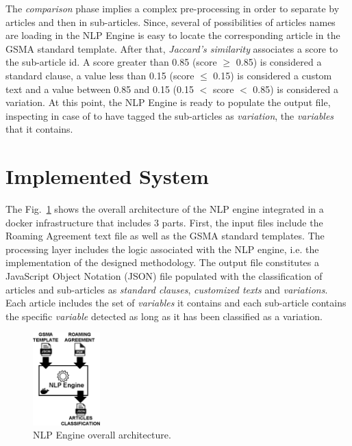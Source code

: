 \documentclass[conference]{style/IEEEtran}
\begin{document}
The \textit{comparison} phase implies a complex pre-processing in order to separate by articles and then in sub-articles. Since, several of possibilities of articles names are loading in the NLP Engine is easy to locate the corresponding article in the GSMA standard template. After that, \textit{Jaccard's similarity} associates a score to the sub-article id. A score greater than 0.85 (score $\geq$ 0.85) is considered a standard clause, a value less than 0.15 (score $\leq$ 0.15) is considered a custom text and a value between 0.85 and 0.15 (0.15 $<$ score $<$ 0.85) is considered a variation. At this point, the NLP Engine is ready to populate the output file, inspecting in case of to have tagged the sub-articles as \textit{variation}, the \textit{variables} that it contains.

\section{Implemented System}
The Fig.~\ref{fig2} shows the overall architecture of the NLP engine integrated in a docker infrastructure that includes 3 parts. First, the input files include the Roaming Agreement text file as well as the GSMA standard templates. The processing layer includes the logic associated with the NLP engine, i.e. the implementation of the designed methodology. The output file constitutes a JavaScript Object Notation (JSON) file populated with the classification of articles and sub-articles as \textit{standard clauses}, \textit{customized texts} and \textit{variations}. Each article includes the set of \textit{variables} it contains and each sub-article contains the specific \textit{variable} detected as long as it has been classified as a variation.

\begin{figure}[htbp]
\centerline{\includegraphics[width=0.23\textwidth]{images/NLP_Engine.png}}
\caption{NLP Engine overall architecture.}
\label{fig2}
\end{figure}
\end{document}
